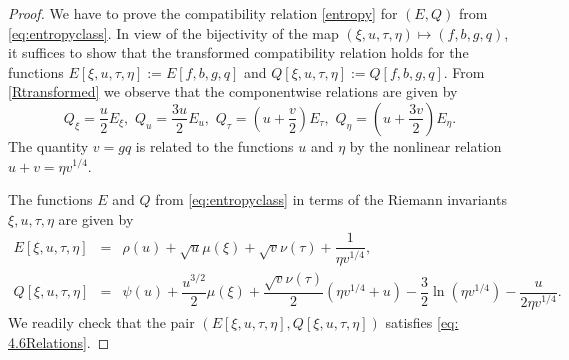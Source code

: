 \documentclass[10pt,a4paper]{amsart}
\begin{document}
\begin{proof} We have to prove the compatibility relation \eqref{entropy} for $(E,Q)$ from \eqref{eq:entropyclass}.  In view of  the bijectivity of the map $(\xi, u, \tau, \eta)\mapsto (f, b, g, q)$, it suffices to  show that 
the transformed compatibility relation holds for the functions $E[\xi, u, \tau, \eta] := E[f, b, g, q]$ and
$Q[\xi, u, \tau, \eta] := Q[f, b, g, q]$.  From \eqref{Rtransformed} we observe that the componentwise 
relations are given by 
\begin{equation}\label{eq: 4.6Relations}
Q_{\xi}=\dfrac{u}{2} E_{\xi},  \,  \,%
    Q_u=\dfrac{3u}{2}E_u,   \,\, %
    Q_{\tau}=\left(u+\dfrac{v}{2}\right) E_{\tau},    \, \, %
    Q_{\eta}= \left(u+\dfrac{3v}{2}\right) E_{\eta}.
\end{equation} 
The quantity $v= gq$ is related to the functions $u$ and $\eta$ by the nonlinear relation $u+v=\eta v^{1/4}$.

The functions $E$ and $Q$  from \eqref{eq:entropyclass}  in terms of the Riemann invariants $\xi, u, \tau, \eta$   are given by 
\[\begin{array}{rcl}
E[\xi, u, \tau, \eta]&=& \rho(u)+\sqrt{u}\mu(\xi)+\sqrt{v}\nu(\tau)+\dfrac{1}{\eta v^{1/4}},\\[2ex]
Q[\xi, u, \tau, \eta]&= &\psi(u)+\dfrac{u^{3/2}}{2}\mu(\xi)+\dfrac{\sqrt{v}\nu(\tau)}{2}\left( \eta v^{1/4}+u\right)-\dfrac{3}{2}\ln\left(\eta v^{1/4}\right)-\dfrac{u}{2\eta v^{1/4}}.
\end{array}
\]
We readily  check that the pair $\left(E[\xi, u, \tau, \eta], Q[\xi, u, \tau, \eta]\right)$ satisfies \eqref{eq: 4.6Relations}.
 \end{proof}
\end{document}
